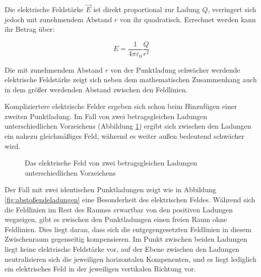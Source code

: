 \begin{frame}
{	Die elektrische Feldstärke $\vec{E}$ ist direkt proportional zur Ladung $Q$, verringert sich 
	jedoch mit zunehmendem Abstand $r$ von ihr quadratisch. Errechnet werden kann ihr Betrag über:


	\begin{equation}
				E = \frac{1}{4 \pi \varepsilon_0} \frac{Q}{r^2}
	\end{equation}


	

		


	Die mit zunehmendem Abstand $r$ von der Punktladung schwächer werdende elektrische Feldstärke
	zeigt sich neben dem mathematischen Zusammenhang auch in dem größer werdenden Abstand zwischen den Feldlinien.


	Kompliziertere elektrische Felder ergeben sich schon beim Hinzufügen einer zweiten Punktladung. 
	Im Fall von zwei betragsgleichen Ladungen unterschiedlichen Vorzeichens 
	(Abbildung \ref{fig:anziehende_ladungen}) ergibt sich zwischen den Ladungen ein
	nahezu gleichmäßiges Feld, während es weiter außen bedeutend schwächer wird. 

	\begin{figure}[ht]
		\centering
		\caption{Das elektrische Feld von zwei betragsgleichen Ladungen unterschiedlichen Vorzeichens}
		\label{fig:anziehende_ladungen}
	\end{figure}

	Der Fall mit zwei identischen Punktladungen zeigt wie in Abbildung \ref{fig:abstoßendeladungen} eine Besonderheit des elektrischen Feldes. 
	Während sich die Feldlinien im Rest des Raumes erwartbar von den positiven Ladungen 
	wegzeigen, gibt es zwischen den Punktladungen einen freien Raum ohne Feldlinien.
	Dies liegt daran, dass sich die entgegengesetzten Feldlinien in diesem Zwischenraum gegenseitig kompensieren. 
	Im Punkt zwischen beiden Ladungen liegt keine elektrische Feldstärke vor, auf der Ebene zwischen den Ladungen
	neutralisieren sich die jeweiligen horizontalen Kompenenten, und es liegt lediglich ein elektrisches Feld in der jeweiligen 
	vertikalen Richtung vor.

}
\end{frame}

